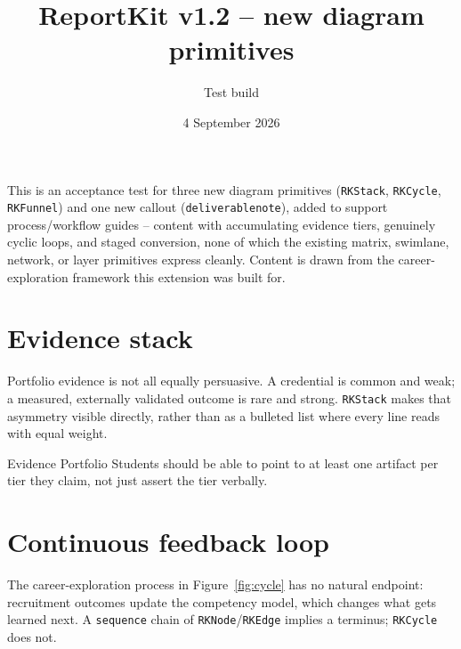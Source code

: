 \documentclass{reportkit}
\title{ReportKit v1.2 -- new diagram primitives}
\author{Test build}
\date{4 September 2026}
\begin{document}
\maketitle

\begin{execsummary}
This is an acceptance test for three new diagram primitives (\texttt{RKStack},
\texttt{RKCycle}, \texttt{RKFunnel}) and one new callout (\texttt{deliverablenote}),
added to support process/workflow guides -- content with accumulating evidence tiers,
genuinely cyclic loops, and staged conversion, none of which the existing matrix,
swimlane, network, or layer primitives express cleanly. Content is drawn from the
career-exploration framework this extension was built for.
\end{execsummary}

\section{Evidence stack}
Portfolio evidence is not all equally persuasive. A credential is common and weak;
a measured, externally validated outcome is rare and strong. \texttt{RKStack} makes
that asymmetry visible directly, rather than as a bulleted list where every line
reads with equal weight.

\begin{diagram}[
  type=stack,
  caption={The career evidence stack.},
  label={fig:stack},
  source={Illustrative progression; ordering reflects persuasiveness, not a measured population.},
  description={Six tiers rising from credential through measured impact, each narrower and rarer than the one below it.}
]
\end{diagram}

\begin{deliverablenote}{Evidence Portfolio}
Students should be able to point to at least one artifact per tier they claim, not
just assert the tier verbally.
\end{deliverablenote}

\section{Continuous feedback loop}
The career-exploration process in Figure~\ref{fig:cycle} has no natural endpoint:
recruitment outcomes update the competency model, which changes what gets learned
next. A \texttt{sequence} chain of \texttt{RKNode}/\texttt{RKEdge} implies a
terminus; \texttt{RKCycle} does not.
\end{document}
